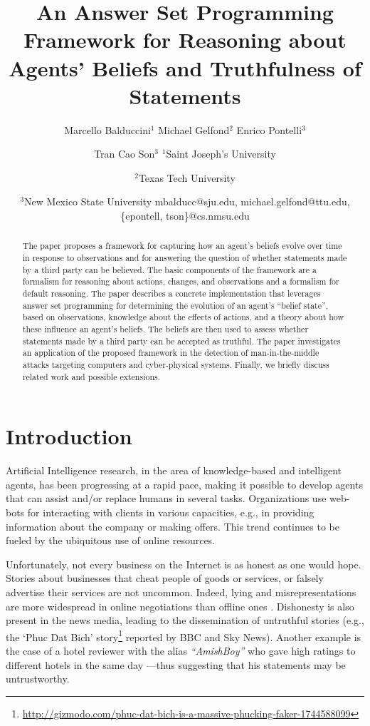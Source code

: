 \documentclass{article}
\title{An Answer Set Programming Framework for Reasoning about Agents' Beliefs and Truthfulness of Statements} %
\author{Marcello Balduccini$^1$ \And 
Michael Gelfond$^2$ \And
Enrico Pontelli$^3$ \and Tran Cao Son$^3$ 
\affiliations
$^1$Saint Joseph's University \and 
$^2$Texas Tech University\and 
$^3$New Mexico State University
\emails
   mbalducc@sju.edu,   
   michael.gelfond@ttu.edu,
\{epontell, tson\}@cs.nmsu.edu 
} %
\begin{document}
  

\label{firstpage}


\maketitle

\begin{abstract}
The paper proposes a framework for capturing how an agent’s beliefs evolve over time  in response to observations and for answering the question of whether  statements 
made by a third party can be believed. The basic components of the framework are a formalism for 
reasoning about actions, changes, and observations and a formalism for default reasoning. 
The paper describes a concrete implementation that leverages answer set programming for   
determining the evolution of an agent's ``belief state'', based on observations, knowledge about the effects of actions, and a theory about how these influence an agent's beliefs. 
The beliefs are then used to assess whether statements made by a third party can be accepted as truthful. The paper investigates an application of the 
proposed framework in the detection of
 man-in-the-middle attacks targeting computers and cyber-physical systems. 
Finally, we briefly 
discuss related work   and   possible extensions. 
\end{abstract}



\section{Introduction} 

Artificial Intelligence research, in the area of knowledge-based and intelligent agents, has been progressing at
a rapid pace, making it possible to develop agents that can assist and/or replace humans in 
several tasks. Organizations  use  web-bots for interacting with clients in various capacities, e.g., in providing information about the company or making offers. This trend continues to be fueled by the ubiquitous use of online resources. 

Unfortunately, not every business on the Internet is as 
honest as one would hope. Stories about businesses that cheat people of goods or services, or falsely advertise their services are not uncommon. Indeed, lying and misrepresentations are more widespread in online negotiations than 
offline ones \cite{elie}. Dishonesty is also present in
the news media, leading to the dissemination of untruthful stories  (e.g., the `Phuc Dat Bich' story\footnote{ 
{\tiny
\url{http://gizmodo.com/phuc-dat-bich-is-a-massive-phucking-faker-1744588099}
}} reported by BBC and Sky News). Another example is the case of a hotel reviewer with the alias {\em ``AmishBoy''} who gave high ratings to different hotels in the same day \cite{MinnichCMLF15}---thus suggesting  that his statements may be untrustworthy.  
\end{document}
